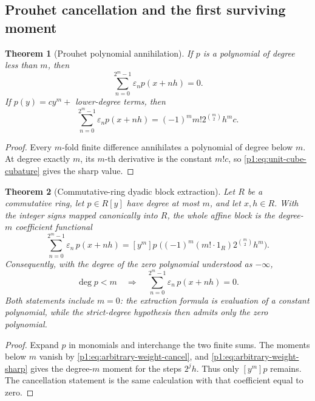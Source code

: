 \documentclass[11pt,oneside]{article}
\numberwithin{equation}{section}
\newtheorem{theorem}{Theorem}[section]
\theoremstyle{definition}
\theoremstyle{remark}
\newcommand{\eps}{\varepsilon}
\begin{document}
\subsection{Prouhet cancellation and the first surviving moment}

\begin{theorem}[Prouhet polynomial annihilation]
\label{p1:thm:prouhet}
If \(p\) is a polynomial of degree less than \(m\), then
\begin{equation}
  \boxed{
  \sum_{n=0}^{2^m-1}\eps_np(x+nh)=0.}
  \label{p1:eq:prouhet-affine}
\end{equation}
If \(p(y)=cy^m+\) lower-degree terms, then
\begin{equation}
  \boxed{
  \sum_{n=0}^{2^m-1}\eps_np(x+nh)
  =(-1)^mm!2^{\binom m2}h^m c.}
  \label{p1:eq:prouhet-sharp-polynomial}
\end{equation}
\end{theorem}

\begin{proof}
Every \(m\)-fold finite difference annihilates a polynomial of degree below
\(m\).  At degree exactly \(m\), its \(m\)-th derivative is the constant
\(m!c\), so \eqref{p1:eq:unit-cube-cubature} gives the sharp value.
\end{proof}

\begin{theorem}[Commutative-ring dyadic block extraction]
\label{p1:thm:prouhet-block-extraction}
Let \(R\) be a commutative ring, let \(p\in R[y]\) have degree at most
\(m\), and let \(x,h\in R\).  With the integer signs mapped canonically
into \(R\), the whole affine block is the degree-\(m\) coefficient
functional
\begin{equation}
 \boxed{
 \sum_{n=0}^{2^m-1}\eps_n\,p(x+nh)
 =[y^m]p\;
   \bigl((-1)^m(m!\cdot1_R)2^{\binom m2}h^m\bigr).}
 \label{p1:eq:prouhet-block-extraction}
\end{equation}
Consequently, with the degree of the zero polynomial understood as
\(-\infty\),
\begin{equation}
 \deg p<m
 \quad\Longrightarrow\quad
 \sum_{n=0}^{2^m-1}\eps_n\,p(x+nh)=0.
 \label{p1:eq:prouhet-block-cancellation}
\end{equation}
Both statements include \(m=0\): the extraction formula is evaluation of a
constant polynomial, while the strict-degree hypothesis then admits only the
zero polynomial.
\end{theorem}

\begin{proof}
Expand \(p\) in monomials and interchange the two finite sums.  The moments
below \(m\) vanish by \eqref{p1:eq:arbitrary-weight-cancel}, and
\eqref{p1:eq:arbitrary-weight-sharp} gives the degree-\(m\) moment for the steps
\(2^jh\).  Thus only \([y^m]p\) remains.  The cancellation statement is the
same calculation with that coefficient equal to zero.
\end{proof}
\end{document}
